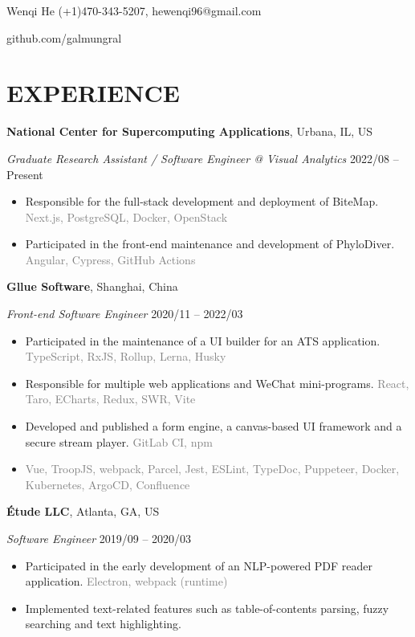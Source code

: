 \documentclass[10pt]{article}
\begin{document}
{\huge Wenqi He} \hfill (+1)470-343-5207, hewenqi96@gmail.com

\hfill github.com/galmungral

\section*{EXPERIENCE}
\textbf{National Center for Supercomputing Applications}, Urbana, IL, US

\textit{Graduate Research Assistant / Software Engineer @ Visual Analytics} \hfill 2022/08 -- Present

\begin{itemize}[itemsep=0pt, topsep=4pt, label=-]
\item Responsible for the full-stack development and deployment of BiteMap. \hfill \textcolor{gray}{Next.js, PostgreSQL, Docker, OpenStack}
\item Participated in the front-end maintenance and development of PhyloDiver. \hfill \textcolor{gray}{Angular, Cypress, GitHub Actions}
\end{itemize}

\vspace{0.5em}
\textbf{Gllue Software}, Shanghai, China

\textit{Front-end Software Engineer}  \hfill 2020/11 -- 2022/03

\begin{itemize}[itemsep=0pt, topsep=4pt, label=-]
\item Participated in the maintenance of a UI builder for an ATS application. \hfill \textcolor{gray}{TypeScript, RxJS, Rollup, Lerna, Husky}
\item Responsible for multiple web applications and WeChat mini-programs. \hfill \textcolor{gray}{React, Taro, ECharts, Redux, SWR, Vite}
\item Developed and published a form engine, a canvas-based UI framework and a secure stream player. \hfill \textcolor{gray}{GitLab CI, npm}
\item \hfill \textcolor{gray}{Vue, TroopJS, webpack, Parcel, Jest, ESLint, TypeDoc, Puppeteer, Docker, Kubernetes, ArgoCD, Confluence}
\end{itemize}
\vspace{0.5em}
\textbf{Étude LLC}, Atlanta, GA, US

\textit{Software Engineer} \hfill 2019/09 -- 2020/03

\begin{itemize}[itemsep=0pt, topsep=4pt, label=-]
\item Participated in the early development of an NLP-powered PDF reader application. \hfill \textcolor{gray}{Electron, webpack (runtime)}
\item Implemented text-related features such as table-of-contents parsing, fuzzy searching and text highlighting.
\end{itemize}
\end{document}
